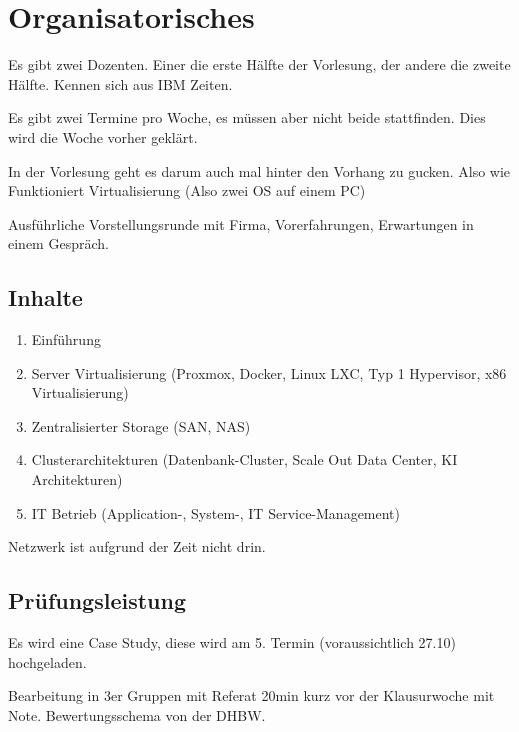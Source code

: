 \documentclass[a4paper]{article}
\title{\docTitle}
\author{Moritz}
\date{\today}
\begin{document}
\maketitle
\tableofcontents


\section{Organisatorisches}

Es gibt zwei Dozenten. Einer die erste Hälfte der Vorlesung, der andere die zweite Hälfte. Kennen sich aus IBM Zeiten.

Es gibt zwei Termine pro Woche, es müssen aber nicht beide stattfinden. Dies wird die Woche vorher geklärt.

In der Vorlesung geht es darum auch mal hinter den Vorhang zu gucken. Also wie Funktioniert Virtualisierung (Also zwei OS auf einem PC)

Ausführliche Vorstellungsrunde mit Firma, Vorerfahrungen, Erwartungen in einem Gespräch.

\subsection{Inhalte}

\begin{enumerate}
    \item Einführung
    \item Server Virtualisierung (Proxmox, Docker, Linux LXC, Typ 1 Hypervisor, x86 Virtualisierung)
    \item Zentralisierter Storage (SAN, NAS)
    \item Clusterarchitekturen (Datenbank-Cluster, Scale Out Data Center, KI Architekturen)
    \item IT Betrieb (Application-, System-, IT Service-Management)
\end{enumerate}

Netzwerk ist aufgrund der Zeit nicht drin.

\subsection{Prüfungsleistung}

Es wird eine Case Study, diese wird am 5. Termin (voraussichtlich 27.10) hochgeladen.

Bearbeitung in 3er Gruppen mit Referat 20min kurz vor der Klausurwoche mit Note. Bewertungsschema von der DHBW.
\end{document}
